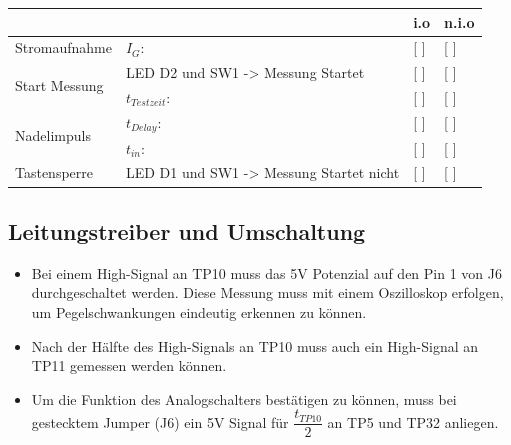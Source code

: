\documentclass[a4paper,11pt]{scrartcl}
\begin{document}
\renewcommand{\arraystretch}{2}
\begin{tabularx}{\textwidth}{p{}| p{} | p{} | p{}}

 &  & i.o & n.i.o \\

\hline

Stromaufnahme & $I_{G}$: & [ ] & [ ] \\

\hline

\multirow{2}{*}{Start Messung}
		& LED D2 und SW1 -> Messung Startet		 							& [ ] & [ ] \\
		& $t_{Testzeit}$:														& [ ] & [ ] \\

\hline

\multirow{2}{*}{Nadelimpuls}
		& $t_{Delay}$:				&	[ ] & [ ] 	\\
		& $t_{in}$: 				&	[ ]	& [ ] 	\\
		
\hline

Tastensperre & LED D1 und SW1 -> Messung Startet nicht & [ ] & [ ] \\
		
\end{tabularx}
\renewcommand{\arraystretch}{1}


\newpage
\subsection{Leitungstreiber und Umschaltung}


\begin{itemize}
	\item{Bei einem High-Signal an TP10 muss das 5V Potenzial auf den Pin 1 von J6 durchgeschaltet werden. Diese Messung muss mit einem Oszilloskop erfolgen, um Pegelschwankungen eindeutig erkennen zu können.}
	
	\item{Nach der Hälfte des High-Signals an TP10 muss auch ein High-Signal an TP11 gemessen werden können.}
	
	\item{Um die Funktion des Analogschalters bestätigen zu können, muss bei gestecktem Jumper (J6) ein 5V Signal für $\dfrac{t_{TP10}}{2}$ an TP5 und TP32 anliegen.}
\end{itemize}
\end{document}

